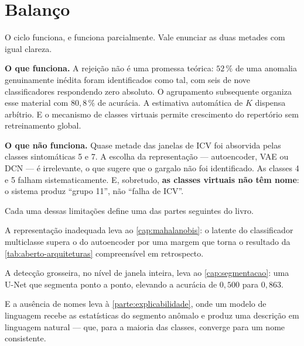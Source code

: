 \section{Balanço}

O ciclo funciona, e funciona parcialmente. Vale enunciar as duas metades com igual
clareza.

\textbf{O que funciona.} A rejeição não é uma promessa teórica: $52\,\%$ de uma anomalia
genuinamente inédita foram identificados como tal, com seis de nove classificadores
respondendo zero absoluto. O agrupamento subsequente organiza esse material com
$80{,}8\,\%$ de acurácia. A estimativa automática de $K$ dispensa arbítrio. E o
mecanismo de classes virtuais permite crescimento do repertório sem retreinamento
global.

\textbf{O que não funciona.} Quase metade das janelas de ICV foi absorvida pelas classes
sintomáticas 5 e 7. A escolha da representação --- autoencoder, VAE ou DCN --- é
irrelevante, o que sugere que o gargalo não foi identificado. As classes 4 e 5 falham
sistematicamente. E, sobretudo, \textbf{as classes virtuais não têm nome}: o sistema
produz ``grupo 11'', não ``falha de ICV''.

\begin{destaque}
Cada uma dessas limitações define uma das partes seguintes do livro.

A representação inadequada leva ao \cref{cap:mahalanobis}: o latente do classificador
multiclasse supera o do autoencoder por uma margem que torna o resultado da
\cref{tab:aberto-arquiteturas} compreensível em retrospecto.

A detecção grosseira, no nível de janela inteira, leva ao \cref{cap:segmentacao}: uma
U-Net que segmenta ponto a ponto, elevando a acurácia de $0{,}500$ para $0{,}863$.

E a ausência de nomes leva à \cref{parte:explicabilidade}, onde um modelo de linguagem
recebe as estatísticas do segmento anômalo e produz uma descrição em linguagem natural
--- que, para a maioria das classes, converge para um nome consistente.
\end{destaque}


